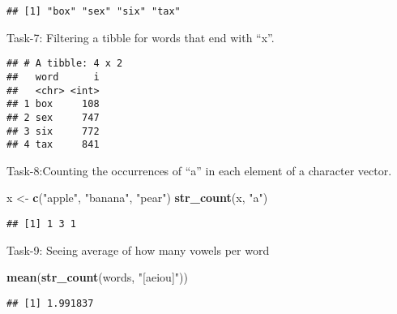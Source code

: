 \documentclass[
]{article}
\newenvironment{Shaded}{\begin{snugshade}}{\end{snugshade}}
\newcommand{\AttributeTok}[1]{\textcolor[rgb]{0.13,0.29,0.53}{#1}}
\newcommand{\FunctionTok}[1]{\textcolor[rgb]{0.13,0.29,0.53}{\textbf{#1}}}
\newcommand{\NormalTok}[1]{#1}
\newcommand{\OtherTok}[1]{\textcolor[rgb]{0.56,0.35,0.01}{#1}}
\newcommand{\SpecialCharTok}[1]{\textcolor[rgb]{0.81,0.36,0.00}{\textbf{#1}}}
\newcommand{\StringTok}[1]{\textcolor[rgb]{0.31,0.60,0.02}{#1}}
\begin{document}
\begin{verbatim}
## [1] "box" "sex" "six" "tax"
\end{verbatim}

Task-7: Filtering a tibble for words that end with ``x''.

\begin{Shaded}
\end{Shaded}

\begin{verbatim}
## # A tibble: 4 x 2
##   word      i
##   <chr> <int>
## 1 box     108
## 2 sex     747
## 3 six     772
## 4 tax     841
\end{verbatim}

Task-8:Counting the occurrences of ``a'' in each element of a character
vector.

\begin{Shaded}
\begin{Highlighting}[]
\NormalTok{x }\OtherTok{\textless{}{-}} \FunctionTok{c}\NormalTok{(}\StringTok{"apple"}\NormalTok{, }\StringTok{"banana"}\NormalTok{, }\StringTok{"pear"}\NormalTok{)}
\FunctionTok{str\_count}\NormalTok{(x, }\StringTok{"a"}\NormalTok{)}
\end{Highlighting}
\end{Shaded}

\begin{verbatim}
## [1] 1 3 1
\end{verbatim}

Task-9: Seeing average of how many vowels per word

\begin{Shaded}
\begin{Highlighting}[]
\FunctionTok{mean}\NormalTok{(}\FunctionTok{str\_count}\NormalTok{(words, }\StringTok{"[aeiou]"}\NormalTok{))}
\end{Highlighting}
\end{Shaded}

\begin{verbatim}
## [1] 1.991837
\end{verbatim}
\end{document}
